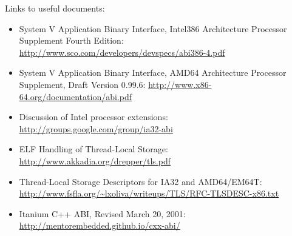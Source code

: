 Links to useful documents:
\begin{itemize}
 \item System V Application Binary Interface, Intel386{\texttrademark} Architecture
       Processor Supplement Fourth Edition:
       \url{http://www.sco.com/developers/devspecs/abi386-4.pdf}
 \item System V Application Binary Interface, AMD64 Architecture Processor
       Supplement, Draft Version 0.99.6:
       \url{http://www.x86-64.org/documentation/abi.pdf}
 \item Discussion of Intel processor extensions:
       \url{http://groups.google.com/group/ia32-abi}
 \item ELF Handling of Thread-Local Storage:
       \url{http://www.akkadia.org/drepper/tls.pdf}
 \item Thread-Local Storage Descriptors for IA32 and AMD64/EM64T:
       \url{http://www.fsfla.org/~lxoliva/writeups/TLS/RFC-TLSDESC-x86.txt}
 \item Itanium C++ ABI, Revised March 20, 2001:
       \url{http://mentorembedded.github.io/cxx-abi/}
\end{itemize}

